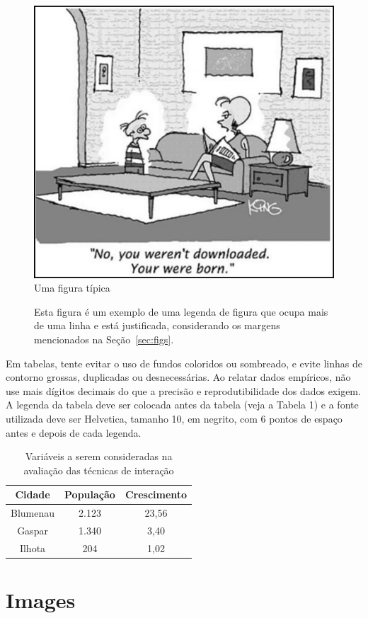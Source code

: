 \documentclass[12pt]{article}
\begin{document}
\begin{figure}[ht]
\centering
\includegraphics[width=.5\textwidth]{fig1.jpg}
\caption{Uma figura típica}
\label{fig:exampleFig1}
\end{figure}

\begin{figure}[ht]
\centering

\caption{Esta figura é um exemplo de uma legenda de figura que ocupa mais de uma linha e 
está justificada, considerando os margens mencionados na Seção~\ref{sec:figs}.}
\label{fig:exampleFig2}
\end{figure}

Em tabelas, tente evitar o uso de fundos coloridos ou sombreado, e evite linhas de contorno grossas, duplicadas ou desnecessárias. Ao relatar dados empíricos, não use mais dígitos decimais do que a precisão e reprodutibilidade dos dados exigem. A legenda da tabela deve ser colocada antes da tabela (veja a Tabela 1) e a fonte utilizada deve ser Helvetica, tamanho 10, em negrito, com 6 pontos de espaço antes e depois de cada legenda.

\begin{table}[ht]
  \centering
  \caption{Variáveis a serem consideradas na avaliação das técnicas de interação}
  \label{tab:exTable1}
  \begin{tabular}{|c|c|c|}
    \hline
    \textbf{Cidade} & \textbf{População} & \textbf{Crescimento} \\
    \hline
    Blumenau & 2.123 & 23,56 \\
    Gaspar & 1.340 & 3,40 \\
    Ilhota & 204 & 1,02 \\
    \hline
  \end{tabular}
\end{table}
    
\section{Images}
\end{document}
